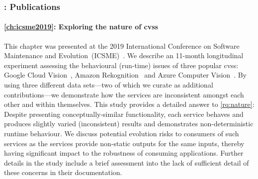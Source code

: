 \subsubsection{: Publications}

\paragraph{\cref{ch:icsme2019}: Exploring the nature of \glspl{cvs}} This chapter was presented at the 2019 International Conference on Software Maintenance and Evolution~(ICSME)~\citep{Cummaudo:2019icsme}. We describe an 11-month longitudinal experiment assessing the behavioural (run-time) issues of three popular \glspl{cvs}: Google Cloud Vision~, Amazon Rekognition~ and Azure Computer Vision~. By using three different data sets---two of which we curate as additional contributions---we demonstrate how the services are inconsistent amongst each other and within themselves. This study provides a detailed answer to \ref{rq:nature}: Despite presenting conceptually-similar functionality, each service behaves and produces slightly varied (inconsistent) results and demonstrates non-deterministic runtime behaviour. We discuss potential evolution risks to consumers of such services as the services provide non-static outputs for the same inputs, thereby having significant impact to the robustness of consuming applications. Further details in the study include a brief assessment into the lack of sufficient detail of these concerns in their documentation.

